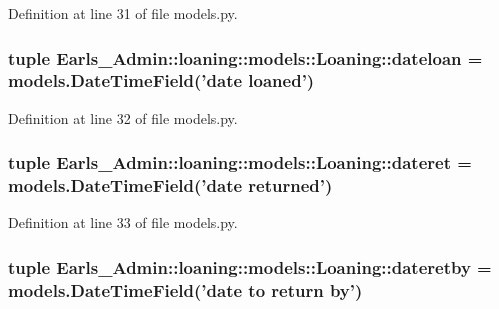 Definition at line 31 of file models.py.\hypertarget{classEarls__Admin_1_1loaning_1_1models_1_1Loaning_cbb5db0c7955589338762081381e174c}{
\subsubsection[dateloan]{\setlength{\rightskip}{0pt plus 5cm}tuple {\bf Earls\_\-Admin::loaning::models::Loaning::dateloan} = models.DateTimeField('date loaned')}}
\label{classEarls__Admin_1_1loaning_1_1models_1_1Loaning_cbb5db0c7955589338762081381e174c}




Definition at line 32 of file models.py.\hypertarget{classEarls__Admin_1_1loaning_1_1models_1_1Loaning_0553958dceb007b5cfe6618a69491081}{
\subsubsection[dateret]{\setlength{\rightskip}{0pt plus 5cm}tuple {\bf Earls\_\-Admin::loaning::models::Loaning::dateret} = models.DateTimeField('date returned')}}
\label{classEarls__Admin_1_1loaning_1_1models_1_1Loaning_0553958dceb007b5cfe6618a69491081}




Definition at line 33 of file models.py.\hypertarget{classEarls__Admin_1_1loaning_1_1models_1_1Loaning_94a6a7787d70181e0d74b237d0c7bd8b}{
\subsubsection[dateretby]{\setlength{\rightskip}{0pt plus 5cm}tuple {\bf Earls\_\-Admin::loaning::models::Loaning::dateretby} = models.DateTimeField('date to return by')}}
\label{classEarls__Admin_1_1loaning_1_1models_1_1Loaning_94a6a7787d70181e0d74b237d0c7bd8b}




